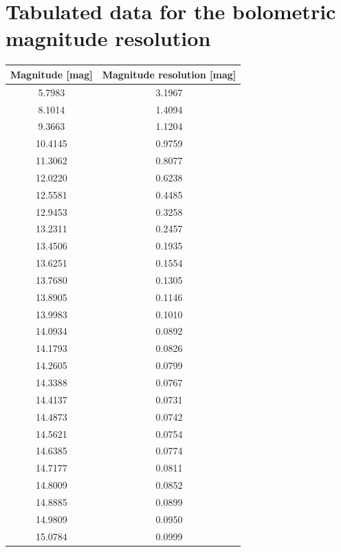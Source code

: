 \documentclass[fleqn,usenatbib]{mnras}
\begin{document}


\appendix

\section{Tabulated data for the bolometric magnitude resolution}
\begin{table}
    \centering
    \begin{tabular}{c|c}
        Magnitude [mag] & Magnitude resolution [mag] \\\hline\hline
        5.7983 & 3.1967\\
        8.1014 & 1.4094\\
        9.3663 & 1.1204\\
        10.4145 & 0.9759\\
        11.3062 & 0.8077\\
        12.0220 & 0.6238\\
        12.5581 & 0.4485\\
        12.9453 & 0.3258\\
        13.2311 & 0.2457\\
        13.4506 & 0.1935\\\hline
        13.6251 & 0.1554\\
        13.7680 & 0.1305\\
        13.8905 & 0.1146\\
        13.9983 & 0.1010\\
        14.0934 & 0.0892\\
        14.1793 & 0.0826\\
        14.2605 & 0.0799\\
        14.3388 & 0.0767\\
        14.4137 & 0.0731\\
        14.4873 & 0.0742\\\hline
        14.5621 & 0.0754\\
        14.6385 & 0.0774\\
        14.7177 & 0.0811\\
        14.8009 & 0.0852\\
        14.8885 & 0.0899\\
        14.9809 & 0.0950\\
        15.0784 & 0.0999\\

\end{tabular}
\end{table}
\end{document}
